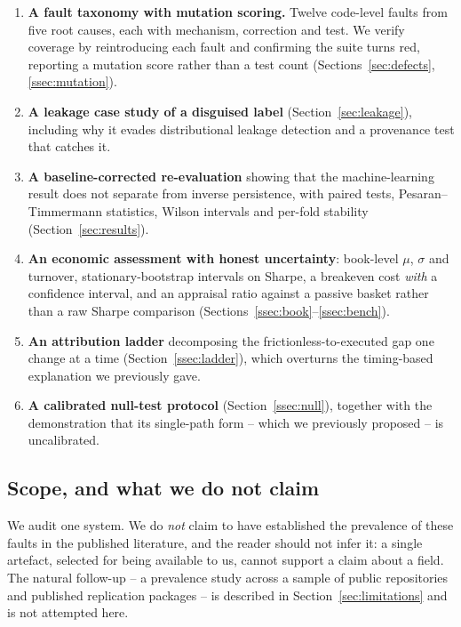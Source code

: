 \documentclass[preprint,12pt,authoryear]{elsarticle}
\begin{document}
\begin{enumerate}
    \item \textbf{A fault taxonomy with mutation scoring.} Twelve code-level
    faults from five root causes, each with mechanism, correction and test. We
    verify coverage by reintroducing each fault and confirming the suite turns
    red, reporting a mutation score rather than a test count
    (Sections~\ref{sec:defects}, \ref{ssec:mutation}).

    \item \textbf{A leakage case study of a disguised label}
    (Section~\ref{sec:leakage}), including why it evades distributional leakage
    detection and a provenance test that catches it.

    \item \textbf{A baseline-corrected re-evaluation} showing that the
    machine-learning result does not separate from inverse persistence, with
    paired tests, Pesaran--Timmermann statistics, Wilson intervals and per-fold
    stability (Section~\ref{sec:results}).

    \item \textbf{An economic assessment with honest uncertainty}: book-level
    $\mu$, $\sigma$ and turnover, stationary-bootstrap intervals on Sharpe, a
    breakeven cost \emph{with} a confidence interval, and an appraisal ratio
    against a passive basket rather than a raw Sharpe comparison
    (Sections~\ref{ssec:book}--\ref{ssec:bench}).

    \item \textbf{An attribution ladder} decomposing the frictionless-to-executed
    gap one change at a time (Section~\ref{ssec:ladder}), which overturns the
    timing-based explanation we previously gave.

    \item \textbf{A calibrated null-test protocol} (Section~\ref{ssec:null}),
    together with the demonstration that its single-path form -- which we
    previously proposed -- is uncalibrated.
\end{enumerate}

\subsection{Scope, and what we do not claim}

We audit one system. We do \emph{not} claim to have established the prevalence
of these faults in the published literature, and the reader should not infer it:
a single artefact, selected for being available to us, cannot support a claim
about a field. The natural follow-up -- a prevalence study across a sample of
public repositories and published replication packages -- is described in
Section~\ref{sec:limitations} and is not attempted here.
\end{document}
